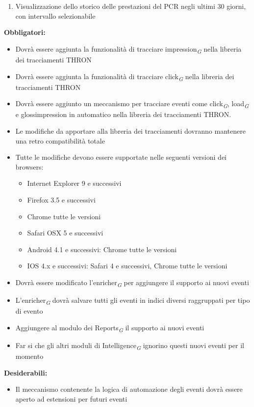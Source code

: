\documentclass[a4paper, 12pt, twoside, openright]{book}
\newcommand{\gloss}[1]{#1\textsubscript{\textit{\tiny{G}}}}
\begin{document}
\begin{enumerate}
	\item Visualizzazione dello storico delle prestazioni del PCR negli ultimi 30 giorni, con intervallo selezionabile
\end{enumerate}
\textbf{Obbligatori:}
\begin{itemize}
\item Dovrà essere aggiunta la funzionalità di tracciare \gloss{impression} nella libreria dei tracciamenti THRON
\item Dovrà essere aggiunta la funzionalità di tracciare \gloss{click} nella libreria dei tracciamenti THRON
\item Dovrà essere aggiunto un meccanismo per tracciare eventi come \gloss{click}, \gloss{load} e gloss{impression} in automatico nella libreria dei tracciamenti THRON.
\item Le modifiche da apportare alla libreria dei tracciamenti dovranno mantenere una retro compatibilità totale
\item Tutte le modifiche devono essere supportate nelle seguenti versioni dei browsers:
	\begin{itemize}
	\item Internet Explorer 9 e successivi
	\item Firefox 3.5 e successivi
	\item Chrome tutte le versioni
	\item Safari OSX 5 e successivi
	\item Android 4.1 e successivi: Chrome tutte le versioni
	\item IOS 4.x e successivi: Safari 4 e successivi, Chrome tutte le versioni
	\end{itemize}
\item Dovrà essere modificato l'\gloss{enricher} per aggiungere il supporto ai nuovi eventi
\item L'\gloss{enricher} dovrà salvare tutti gli eventi in indici diversi raggruppati per tipo di evento
\item Aggiungere al modulo dei \gloss{Reports} il supporto ai nuovi eventi
\item Far si che gli altri \gloss{moduli di Intelligence} ignorino questi nuovi eventi per il momento
\end{itemize}

\textbf{Desiderabili:}
\begin{itemize}
\item Il meccanismo contenente la logica di automazione degli eventi dovrà essere aperto ad estensioni per futuri eventi
\end{itemize}
\end{document}
